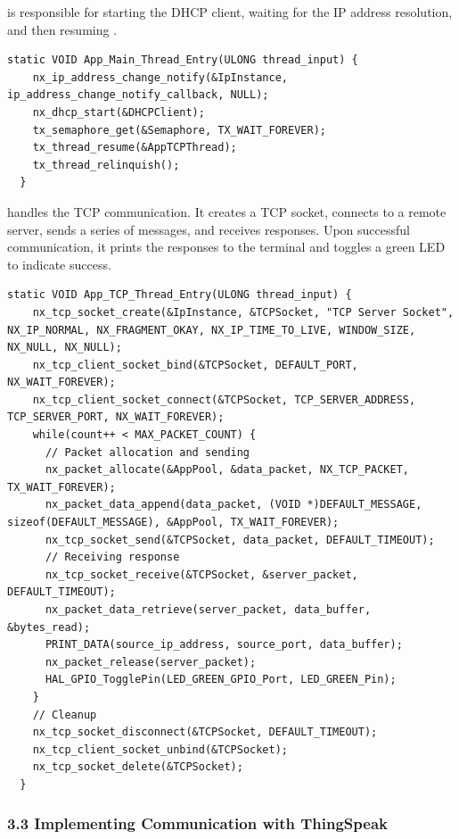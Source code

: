 \documentclass[10pt,a4paper,onecolumn]{article}
\let\textttOrig=\texttt
\def\texttt#1{\expandafter\textttOrig{\seqsplit{#1}}}
\begin{document}
\texttt{AppMainThread} is responsible for starting the DHCP client,
waiting for the IP address resolution, and then resuming
\texttt{AppTCPThread}.

\begin{lstlisting}[style=CStyle]
  static VOID App_Main_Thread_Entry(ULONG thread_input) {
    nx_ip_address_change_notify(&IpInstance, ip_address_change_notify_callback, NULL);
    nx_dhcp_start(&DHCPClient);
    tx_semaphore_get(&Semaphore, TX_WAIT_FOREVER);
    tx_thread_resume(&AppTCPThread);
    tx_thread_relinquish();
  }
\end{lstlisting}

\texttt{AppTCPThread} handles the TCP communication. It creates a TCP
socket, connects to a remote server, sends a series of messages, and
receives responses. Upon successful communication, it prints the
responses to the terminal and toggles a green LED to indicate success.

\begin{lstlisting}[style=CStyle]
  static VOID App_TCP_Thread_Entry(ULONG thread_input) {
    nx_tcp_socket_create(&IpInstance, &TCPSocket, "TCP Server Socket", NX_IP_NORMAL, NX_FRAGMENT_OKAY, NX_IP_TIME_TO_LIVE, WINDOW_SIZE, NX_NULL, NX_NULL);
    nx_tcp_client_socket_bind(&TCPSocket, DEFAULT_PORT, NX_WAIT_FOREVER);
    nx_tcp_client_socket_connect(&TCPSocket, TCP_SERVER_ADDRESS, TCP_SERVER_PORT, NX_WAIT_FOREVER);
    while(count++ < MAX_PACKET_COUNT) {
      // Packet allocation and sending
      nx_packet_allocate(&AppPool, &data_packet, NX_TCP_PACKET, TX_WAIT_FOREVER);
      nx_packet_data_append(data_packet, (VOID *)DEFAULT_MESSAGE, sizeof(DEFAULT_MESSAGE), &AppPool, TX_WAIT_FOREVER);
      nx_tcp_socket_send(&TCPSocket, data_packet, DEFAULT_TIMEOUT);
      // Receiving response
      nx_tcp_socket_receive(&TCPSocket, &server_packet, DEFAULT_TIMEOUT);
      nx_packet_data_retrieve(server_packet, data_buffer, &bytes_read);
      PRINT_DATA(source_ip_address, source_port, data_buffer);
      nx_packet_release(server_packet);
      HAL_GPIO_TogglePin(LED_GREEN_GPIO_Port, LED_GREEN_Pin);
    }
    // Cleanup
    nx_tcp_socket_disconnect(&TCPSocket, DEFAULT_TIMEOUT);
    nx_tcp_client_socket_unbind(&TCPSocket);
    nx_tcp_socket_delete(&TCPSocket);
  }
\end{lstlisting}

\hypertarget{implementing-communication-with-thingspeak}{%
\subsubsection{3.3 Implementing Communication with
ThingSpeak}\label{implementing-communication-with-thingspeak}}
\end{document}
